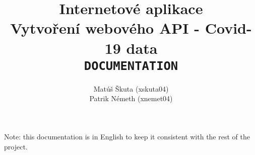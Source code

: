 \documentclass[pdftex, 11pt, a4paper]{article}
\begin{document}
    \title{Internetové aplikace \\
        Vytvoření webového API - Covid-19 data \\
        \texttt{DOCUMENTATION}}
    \author{Matúš Škuta (xskuta04) \\ Patrik Németh (xnemet04)}
    \maketitle

    \begin{center}
        Note: this documentation is in English to keep it consistent with the rest of
        the project.
    \end{center}
\end{document}
